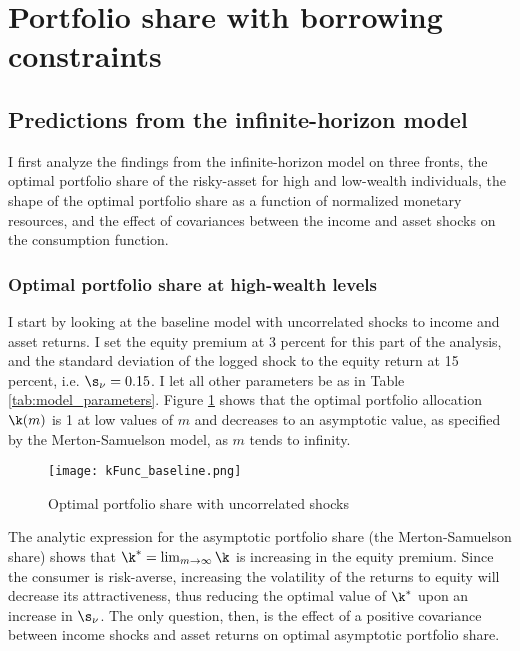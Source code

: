 \section{Portfolio share with borrowing constraints}\label{results}

\subsection{Predictions from the infinite-horizon model}

I first analyze the findings from the infinite-horizon model on three fronts, the optimal portfolio share of the risky-asset for high and low-wealth individuals, the shape of the optimal portfolio share as a function of normalized monetary resources, and the effect of covariances between the income and asset shocks on the consumption function.

\subsubsection{Optimal portfolio share at high-wealth levels}

I start by looking at the baseline model with uncorrelated shocks to income and asset returns. I set the equity premium at 3 percent for this part of the analysis, and the standard deviation of the logged shock to the equity return at 15 percent, i.e. $\s_{\nu} = 0.15$. I let all other parameters be as in Table \ref{tab:model_parameters}. Figure \ref{fig:baseline_portfolio} shows that the optimal portfolio allocation $\k(m)$ is 1 at low values of $m$ and decreases to an asymptotic value, as specified by the Merton-Samuelson model, as $m$ tends to infinity.

\begin{figure}[h]
    \centering
    \texttt{[image: kFunc\_baseline.png]}
    \caption{Optimal portfolio share with uncorrelated shocks}
    \label{fig:baseline_portfolio}
\end{figure}

The analytic expression for the asymptotic portfolio share (the Merton-Samuelson share) shows that $\k^* = \lim_{m\to\infty}\k$ is increasing in the equity premium. Since the consumer is risk-averse, increasing the volatility of the returns to equity will decrease its attractiveness, thus reducing the optimal value of $\k^*$ upon an increase in $\s_{\nu}$. The only question, then, is the effect of a positive covariance between income shocks and asset returns on optimal asymptotic portfolio share.

